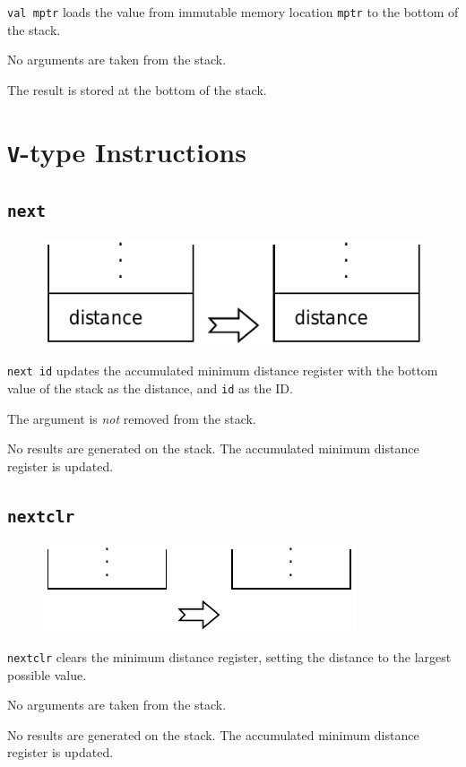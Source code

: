 			\texttt{val mptr} loads the value from immutable memory location 
			\texttt{mptr} to the bottom of the stack.
			
			No arguments are taken from the stack.
			
			The result is stored at the bottom of the stack.
	
	\qquad

\newpage
\section{\texttt{V}-type Instructions}

	\subsection*{\texttt{next}}
	
		\begin{figure}
			\begin{flushright}
				\includegraphics[width=\linewidth]{figure/pdf/i_next} 
			\end{flushright}
		\end{figure}
	
			\texttt{next id} updates the accumulated minimum distance register
			with the bottom value of the stack as the distance, and \texttt{id}
			as the ID.

			The argument is \emph{not} removed from the stack.
			
			No results are generated on the stack. The accumulated minimum 
			distance register is updated.
	
	\qquad

	\subsection*{\texttt{nextclr}}
	
		\begin{figure}
			\begin{flushright}
				\includegraphics[width=\linewidth]{figure/pdf/i_nop} 
			\end{flushright}
		\end{figure}
	
			\texttt{nextclr} clears the minimum distance register, setting the
			distance to the largest possible value.

			No arguments are taken from the stack.
			
			No results are generated on the stack. The accumulated minimum 
			distance register is updated.
	
	\qquad
